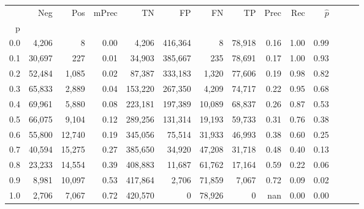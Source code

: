 \begin{tabular}{rrrrrrrrrrrrrr}
\toprule
{} &     Neg &     Pos & mPrec &       TN &       FP &      FN &      TP &  Prec &   Rec & $\hat{p}$ \\
p   &         &         &       &          &          &         &         &       &       &           \\
\midrule
0.0 &   4,206 &       8 &  0.00 &    4,206 &  416,364 &       8 &  78,918 &  0.16 &  1.00 &      0.99 \\
0.1 &  30,697 &     227 &  0.01 &   34,903 &  385,667 &     235 &  78,691 &  0.17 &  1.00 &      0.93 \\
0.2 &  52,484 &   1,085 &  0.02 &   87,387 &  333,183 &   1,320 &  77,606 &  0.19 &  0.98 &      0.82 \\
0.3 &  65,833 &   2,889 &  0.04 &  153,220 &  267,350 &   4,209 &  74,717 &  0.22 &  0.95 &      0.68 \\
0.4 &  69,961 &   5,880 &  0.08 &  223,181 &  197,389 &  10,089 &  68,837 &  0.26 &  0.87 &      0.53 \\
0.5 &  66,075 &   9,104 &  0.12 &  289,256 &  131,314 &  19,193 &  59,733 &  0.31 &  0.76 &      0.38 \\
0.6 &  55,800 &  12,740 &  0.19 &  345,056 &   75,514 &  31,933 &  46,993 &  0.38 &  0.60 &      0.25 \\
0.7 &  40,594 &  15,275 &  0.27 &  385,650 &   34,920 &  47,208 &  31,718 &  0.48 &  0.40 &      0.13 \\
0.8 &  23,233 &  14,554 &  0.39 &  408,883 &   11,687 &  61,762 &  17,164 &  0.59 &  0.22 &      0.06 \\
0.9 &   8,981 &  10,097 &  0.53 &  417,864 &    2,706 &  71,859 &   7,067 &  0.72 &  0.09 &      0.02 \\
1.0 &   2,706 &   7,067 &  0.72 &  420,570 &        0 &  78,926 &       0 &   nan &  0.00 &      0.00 \\
\bottomrule
\end{tabular}
